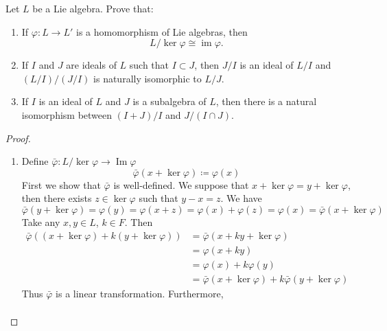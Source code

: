 \documentclass[../main.tex]{subfiles}
\begin{document}
\begin{exercise}{}{}
Let $L$ be a Lie algebra. Prove that:
\begin{enumerate}
\item[(a)] If $\varphi: L \to L'$ is a homomorphism of Lie algebras, then
\[
L/\ker\varphi \cong \operatorname{im}\varphi.
\]
\item[(b)] If $I$ and $J$ are ideals of $L$ such that $I \subset J$, then $J/I$ is an ideal of $L/I$ and $(L/I)/(J/I)$ is naturally isomorphic to $L/J$.
\item[(c)] If $I$ is an ideal of $L$ and $J$ is a subalgebra of $L$, then there is a natural isomorphism between $(I+J)/I$ and $J/(I \cap J)$.
\end{enumerate}
\end{exercise}
\begin{proof}
     \begin{enumerate}
          \item[(a)] Define \(   \bar{\varphi} : L/\operatorname{ker}\varphi \to \operatorname{Im}\varphi  \) \[
        \bar{\varphi}\left( x+ \operatorname{ker}\varphi  \right)\coloneqq  \varphi \left( x \right)  
          \] First we show that \(   \bar{\varphi}  \) is well-defined. We suppose that \(  x+ \operatorname{ker}\varphi = y+ \operatorname{ker}\varphi   \), then there exists \(  z \in \operatorname{ker}\varphi   \) such that \(  y-x= z  \). We have \[
           \bar{\varphi}\left( y+ \operatorname{ker} \varphi  \right)=  \varphi \left( y \right)=    \varphi \left( x+ z \right)=  \varphi \left( x \right)+  \varphi \left( z \right)=  \varphi \left( x \right)=  \bar{\varphi}\left( x+ \operatorname{ker} \varphi  \right)     
          \] Take any \(  x,y\in L  \),  \(  k \in F  \). Then \[
         \begin{aligned}
           \bar{\varphi}\left( \left( x+ \operatorname{ker} \varphi  \right)+ k\left( y+ \operatorname{ker} \varphi  \right)  \right) &=   \bar{\varphi}\left( x+ ky+ \operatorname{ker} \varphi  \right)\\ 
            &=  \varphi \left( x+ ky \right)\\ 
             &=  \varphi \left( x \right)+ k \varphi \left( y \right)\\ 
              &=   \bar{\varphi}\left( x+ \operatorname{ker} \varphi  \right)+ k \bar{\varphi} \left( y+ \operatorname{ker} \varphi  \right)       
         \end{aligned}
          \]  Thus \(   \bar{\varphi}  \) is a linear transformation. Furthermore, \[
          \begin{aligned}

\end{aligned}\]
\end{enumerate}
\end{proof}
\end{document}
